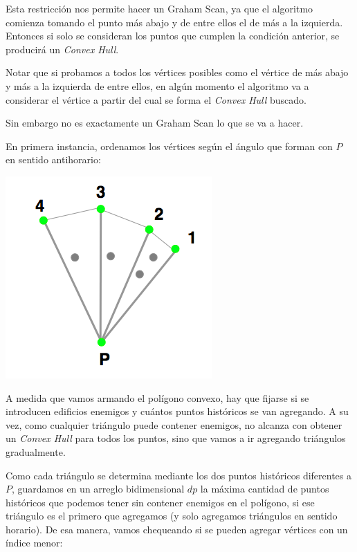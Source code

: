 Esta restricción nos permite hacer un Graham Scan, ya que el algoritmo comienza tomando el punto más abajo y de
entre ellos el de más a la izquierda. Entonces si solo se consideran los puntos que cumplen la condición anterior,
se producirá un \textit{Convex Hull}. 

Notar que si probamos a todos los vértices posibles como el vértice de más abajo y más a la izquierda de entre ellos,
en algún momento el algoritmo va a considerar el vértice a partir del cual se forma el \textit{Convex Hull} buscado.

Sin embargo no es exactamente un Graham Scan lo que se va a hacer.

En primera instancia, ordenamos los vértices según el ángulo que forman con $P$ en sentido antihorario:

\includegraphics[scale=0.5]{img/ej34.png}

A medida que vamos armando el polígono convexo, hay que fijarse si se introducen edificios enemigos y cuántos
puntos históricos se van agregando. A su vez, como cualquier triángulo puede contener enemigos, no alcanza
con obtener un \textit{Convex Hull} para todos los puntos, sino que vamos a ir agregando triángulos gradualmente.

Como cada triángulo se determina mediante los dos puntos históricos diferentes a $P$, guardamos en un arreglo 
bidimensional $dp$ la máxima cantidad de puntos históricos que podemos tener sin contener enemigos en el polígono, si ese triángulo es el primero que agregamos (y solo agregamos triángulos en sentido horario). De esa manera, vamos chequeando
si se pueden agregar vértices con un índice menor:

